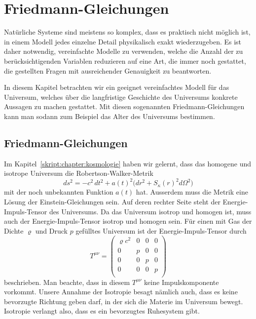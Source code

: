 %
%
%
\chapter{Friedmann-Gleichungen%
\label{skript:chapter:friedmann}}
\rhead{}
Natürliche Systeme sind meistens so komplex, dass es praktisch nicht
möglich ist, in einem Modell jedes einzelne Detail physikalisch exakt
wiederzugeben.
Es ist daher notwendig, vereinfachte Modelle zu verwenden, welche 
die Anzahl der zu berücksichtigenden Variablen reduzieren auf eine
Art, die immer noch gestattet, die gestellten Fragen mit ausreichender
Genauigkeit zu beantworten.

In diesem Kapitel betrachten wir ein geeignet vereinfachtes
Modell für das Universum, welches über die langfristige
Geschichte des Universums konkrete Aussagen zu machen gestattet.
Mit diesen sogenannten Friedmann-Gleichungen kann man sodann zum
Beispiel das Alter des Universums bestimmen.

\section{Friedmann-Gleichungen}
Im Kapitel~\ref{skript:chapter:kosmologie} haben wir gelernt, dass
das homogene und isotrope Universum die Robertson-Walker-Metrik 
\[
ds^2
=
-c^2\,dt^2
+
a(t)^2\bigl(
dr^2 + S_\kappa(r)^2d\Omega^2
\bigr)
\]
mit der noch unbekannten Funktion $a(t)$ hat.
Ausserdem muss die Metrik eine Lösung der Einstein-Gleichungen sein.
Auf deren rechter Seite steht der Energie-Impuls-Tensor des Universums.
Da das Universum isotrop und homogen ist, muss auch der Energie-Impuls-Tensor
isotrop und homogen sein.
Für einen mit Gas der Dichte $\varrho$ und Druck $p$ gefülltes Universum
ist der Energie-Impuls-Tensor durch
\[
T^{\mu\nu}
=
\begin{pmatrix}
\varrho c^2 & 0 & 0 & 0 \\
     0      & p & 0 & 0 \\
     0      & 0 & p & 0 \\
     0      & 0 & 0 & p \\
\end{pmatrix}
\]
beschrieben.
Man beachte, dass in diesem $T^{\mu\nu}$ keine Impulskomponente vorkommt.
Unsere Annahme der Isotropie besagt nämlich auch, dass es keine
bevorzugte Richtung geben darf, in der sich die Materie im Universum
bewegt.
Isotropie verlangt also, dass es ein bevorzugtes Ruhesystem gibt.
%

